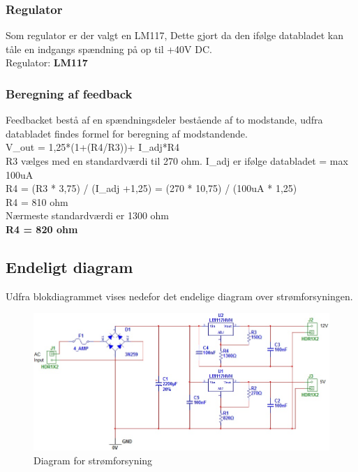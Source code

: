 \subsubsection{Regulator}
Som regulator er der valgt en LM117, Dette gjort da den ifølge databladet kan tåle en indgangs spændning på op til +40V DC. \\
Regulator: \textbf{LM117}
\subsubsection{Beregning af feedback}
Feedbacket bestå af en spændningsdeler bestående af to modstande, udfra databladet findes formel for beregning af modstandende. \\
V\_out = 1,25*(1+(R4/R3))+ I\_adj*R4 \\
R3 vælges med en standardværdi til 270 ohm. I\_adj er ifølge databladet = max 100uA \\
R4 = (R3 * 3,75) / (I\_adj +1,25) = (270 * 10,75) / (100uA * 1,25) \\
R4 = 810 ohm \\
Nærmeste standardværdi er 1300 ohm \\
\textbf{R4 = 820 ohm}
\newpage
\subsection{Endeligt diagram}
Udfra blokdiagrammet vises nedefor det endelige diagram over strømforsyningen.
\begin{figure}[H]
\centering
\includegraphics[scale=0.7]{billeder/final_power}
\caption{Diagram for strømforsyning}
\label{fig:Dia_finalpower}
\end{figure}

